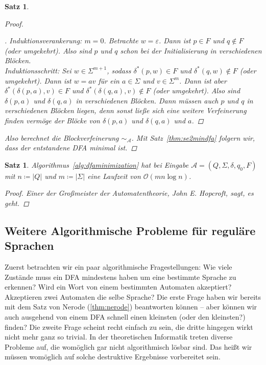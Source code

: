 \documentclass[11pt, a4paper]{article}
\theoremstyle{definition}
\theoremstyle{plain}
\newtheorem{theorem}[definition]{Satz}
\numberwithin{equation}{section}
\newenvironment{subproof}[1][\proofname]{\renewcommand{\qedsymbol}{$\blacksquare$}\vspace{-3ex}\begin{proof}[#1]}{\end{proof}\vspace{-3ex}}
\begin{document}
\begin{theorem}
\begin{proof}
\begin{enumerate}
\begin{subproof}
					Induktionsverankerung: $m = 0$. Betrachte $w = \varepsilon$. Dann ist $p \in F$ und $q \notin F$ (oder umgekehrt). Also sind $p$ und $q$ schon bei der Initialisierung in verschiedenen Blöcken.\checkmark\\
					Induktionsschritt: Sei $w \in \Sigma^{m+1}$, sodass $\delta^\ast(p, w) \in F$ und $\delta^\ast(q, w) \notin F$ (oder umgekehrt). Dann ist $w = av$ für ein $a \in \Sigma$ und $v \in \Sigma^m$. Dann ist aber $\delta^\ast(\delta(p, a), v) \in F$ und $\delta^\ast(\delta(q, a), v) \notin F$ (oder umgekehrt). Also sind $\delta(p, a)$ und $\delta(q, a)$ in verschiedenen Blöcken. Dann müssen auch $p$ und $q$ in verschiedenen Blöcken liegen, denn sonst ließe sich eine weitere Verfeinerung finden vermöge der Blöcke von $\delta(p, a)$ und $\delta(q, a)$ und $a$.
				\end{subproof}
		\end{enumerate}
		Also berechnet die Blockverfeinerung $\sim_\mathcal{A}$. Mit Satz~\ref{thm:se2mindfa} folgern wir, dass der entstandene DFA minimal ist.
	\end{proof}
\end{theorem}
\begin{theorem}
	Algorithmus~\ref{alg:dfaminimization} hat bei Eingabe $\mathcal{A} = (Q, \Sigma, \delta, q_0, F)$ mit $n \coloneqq |Q|$ und $m \coloneqq |\Sigma|$ eine Laufzeit von $\mathcal{O}(mn \log n)$.
	\begin{proof}
		Einer der Großmeister der Automatentheorie, John E. Hopcroft, sagt, es geht.
	\end{proof}
\end{theorem}


\subsection{Weitere Algorithmische Probleme für reguläre Sprachen}\label{sec:regular_algorithms}
Zuerst betrachten wir ein paar algorithmische Fragestellungen: Wie viele Zustände muss ein DFA mindestens haben um eine bestimmte Sprache zu erkennen? Wird ein Wort von einem bestimmten Automaten akzeptiert? Akzeptieren zwei Automaten die selbe Sprache?
Die erste Frage haben wir bereits mit dem Satz von Nerode (\ref{thm:nerode}) beantworten können -- aber können wir auch ausgehend von einem DFA schnell einen kleinsten (oder den kleinsten?) finden? Die zweite Frage scheint recht einfach zu sein, die dritte hingegen wirkt nicht mehr ganz so trivial. In der theoretischen Informatik treten diverse Probleme auf, die womöglich gar nicht algorithmisch lösbar sind. Das heißt wir müssen womöglich auf solche destruktive Ergebnisse vorbereitet sein.
\end{document}
